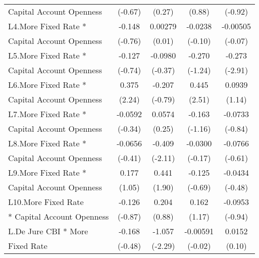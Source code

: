 {\begin{tabular}{l*{4}{c}}
Capital Account Openness&     (-0.67)         &      (0.27)         &      (0.88)         &     (-0.92)         \\
[1em]
L4.More Fixed Rate *&      -0.148         &     0.00279         &     -0.0238         &    -0.00505         \\
Capital Account Openness&     (-0.76)         &      (0.01)         &     (-0.10)         &     (-0.07)         \\
[1em]
L5.More Fixed Rate *&      -0.127         &     -0.0980         &      -0.270         &      -0.273\sym{**} \\
Capital Account Openness&     (-0.74)         &     (-0.37)         &     (-1.24)         &     (-2.91)         \\
[1em]
L6.More Fixed Rate *&       0.375\sym{*}  &      -0.207         &       0.445\sym{*}  &      0.0939         \\
Capital Account Openness&      (2.24)         &     (-0.79)         &      (2.51)         &      (1.14)         \\
[1em]
L7.More Fixed Rate *&     -0.0592         &      0.0574         &      -0.163         &     -0.0733         \\
Capital Account Openness&     (-0.34)         &      (0.25)         &     (-1.16)         &     (-0.84)         \\
[1em]
L8.More Fixed Rate *&     -0.0656         &      -0.409\sym{*}  &     -0.0300         &     -0.0766         \\
Capital Account Openness&     (-0.41)         &     (-2.11)         &     (-0.17)         &     (-0.61)         \\
[1em]
L9.More Fixed Rate *&       0.177         &       0.441         &      -0.125         &     -0.0434         \\
Capital Account Openness&      (1.05)         &      (1.90)         &     (-0.69)         &     (-0.48)         \\
[1em]
L10.More Fixed Rate &      -0.126         &       0.204         &       0.162         &     -0.0953         \\
* Capital Account Openness&     (-0.87)         &      (0.88)         &      (1.17)         &     (-0.94)         \\
[1em]
L.De Jure CBI * More&      -0.168         &      -1.057\sym{*}  &    -0.00591         &      0.0152         \\
Fixed Rate          &     (-0.48)         &     (-2.29)         &     (-0.02)         &      (0.10)         \\

\end{tabular}}
